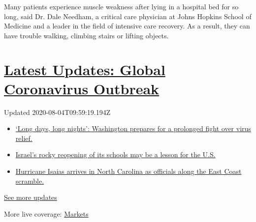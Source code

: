 Many patients experience muscle weakness after lying in a hospital bed
for so long, said Dr. Dale Needham, a critical care physician at Johns
Hopkins School of Medicine and a leader in the field of intensive care
recovery. As a result, they can have trouble walking, climbing stairs or
lifting objects.

\hypertarget{latest-updates-global-coronavirus-outbreak}{%
\section{\texorpdfstring{\href{https://www.nytimes.com/2020/08/04/world/coronavirus-covid-19.html?action=click\&pgtype=Article\&state=default\&region=MAIN_CONTENT_1\&context=storylines_live_updates}{Latest
Updates: Global Coronavirus
Outbreak}}{Latest Updates: Global Coronavirus Outbreak}}\label{latest-updates-global-coronavirus-outbreak}}

Updated 2020-08-04T09:59:19.194Z

\begin{itemize}
\tightlist
\item
  \href{https://www.nytimes.com/2020/08/04/world/coronavirus-covid-19.html?action=click\&pgtype=Article\&state=default\&region=MAIN_CONTENT_1\&context=storylines_live_updates\#link-6b644638}{`Long
  days, long nights': Washington prepares for a prolonged fight over
  virus relief.}
\item
  \href{https://www.nytimes.com/2020/08/04/world/coronavirus-covid-19.html?action=click\&pgtype=Article\&state=default\&region=MAIN_CONTENT_1\&context=storylines_live_updates\#link-7af9fca0}{Israel's
  rocky reopening of its schools may be a lesson for the U.S.}
\item
  \href{https://www.nytimes.com/2020/08/04/world/coronavirus-covid-19.html?action=click\&pgtype=Article\&state=default\&region=MAIN_CONTENT_1\&context=storylines_live_updates\#link-33bf9168}{Hurricane
  Isaias arrives in North Carolina as officials along the East Coast
  scramble.}
\end{itemize}

\href{https://www.nytimes.com/2020/08/04/world/coronavirus-covid-19.html?action=click\&pgtype=Article\&state=default\&region=MAIN_CONTENT_1\&context=storylines_live_updates}{See
more updates}

More live coverage:
\href{https://www.nytimes.com/live/2020/08/03/business/stock-market-today-coronavirus?action=click\&pgtype=Article\&state=default\&region=MAIN_CONTENT_1\&context=storylines_live_updates}{Markets}

